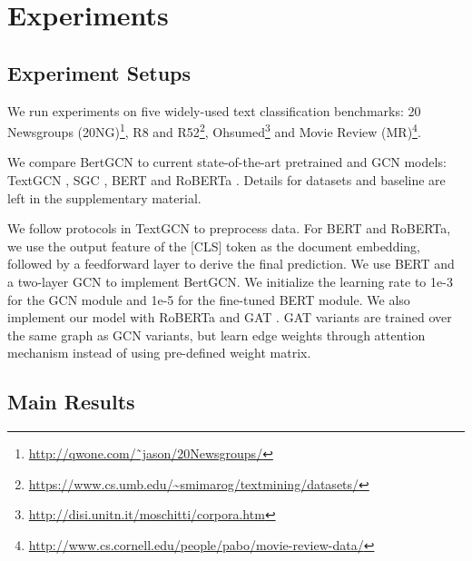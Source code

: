\documentclass[11pt,a4paper]{article}
\begin{document}
\section{Experiments}
\subsection{Experiment Setups}
We run experiments on five widely-used  text classification benchmarks: 20 Newsgroups (20NG)\footnote{\url{http://qwone.com/˜jason/20Newsgroups/}}, R8 and R52\footnote{\url{https://www.cs.umb.edu/~smimarog/textmining/datasets/}}, Ohsumed\footnote{\url{http://disi.unitn.it/moschitti/corpora.htm}} and Movie Review (MR)\footnote{\url{http://www.cs.cornell.edu/people/pabo/movie-review-data/}}. 

We compare BertGCN to current state-of-the-art pretrained and GCN models: TextGCN \citep{yao2019graph}, SGC \citep{wu2019simplifying}, BERT \citep{devlin2018bert} and RoBERTa \citep{yinhan2019roberta}. Details for datasets and baseline are left in the supplementary material.

We follow protocols in TextGCN to preprocess data. 
For BERT and RoBERTa, we use the output feature of the [CLS] token as the document embedding, followed by a feedforward layer to derive the final prediction. We use BERT and a two-layer GCN to implement BertGCN. We initialize the learning rate to 1e-3 for the GCN module and 1e-5 for the fine-tuned BERT module. We also implement our model with RoBERTa and GAT \citep{velivckovic2017graph}. GAT variants are trained over the same graph as GCN variants, but learn edge weights through attention mechanism instead of using pre-defined weight matrix.

\subsection{Main Results}
\end{document}
